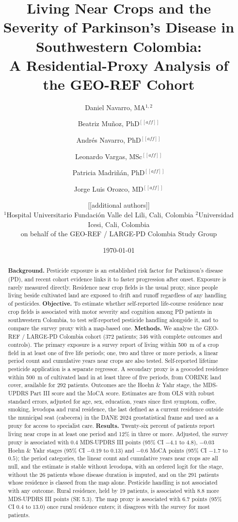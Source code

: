 \documentclass[11pt,a4paper]{article}
\title{Living Near Crops and the Severity of Parkinson's Disease in Southwestern Colombia:\\ A Residential-Proxy Analysis of the GEO-REF Cohort}
\author{Daniel Navarro, MA$^{1,2}$ \and Beatriz Mu\~noz, PhD$^{[[aff]]}$ \and Andr\'es Navarro, PhD$^{[[aff]]}$ \and Leonardo Vargas, MSc$^{[[aff]]}$ \and Patricia Madri\~n\'an, PhD$^{[[aff]]}$ \and Jorge Luis Orozco, MD$^{[[aff]]}$ \and [[additional authors]]\\[1ex]
\small $^{1}$Hospital Universitario Fundaci\'on Valle del Lili, Cali, Colombia \quad $^{2}$Universidad Icesi, Cali, Colombia\\
\small on behalf of the GEO-REF / LARGE-PD Colombia Study Group}
\date{\today}
\begin{document}
\maketitle

\begin{abstract}
\noindent\textbf{Background.} Pesticide exposure is an established risk factor for Parkinson's disease (PD), and recent cohort evidence links it to faster progression after onset. Exposure is rarely measured directly. Residence near crop fields is the usual proxy, since people living beside cultivated land are exposed to drift and runoff regardless of any handling of pesticides.
\textbf{Objective.} To estimate whether self-reported life-course residence near crop fields is associated with motor severity and cognition among PD patients in southwestern Colombia, to test self-reported pesticide handling alongside it, and to compare the survey proxy with a map-based one.
\textbf{Methods.} We analyse the GEO-REF / LARGE-PD Colombia cohort (372 patients; 346 with complete outcomes and controls). The primary exposure is a survey report of living within 500~m of a crop field in at least one of five life periods; one, two and three or more periods, a linear period count and cumulative years near crops are also tested. Self-reported lifetime pesticide application is a separate regressor. A secondary proxy is a geocoded residence within 500~m of cultivated land in at least three of five periods, from CORINE land cover, available for 292 patients. Outcomes are the Hoehn \& Yahr stage, the MDS-UPDRS Part III score and the MoCA score. Estimates are from OLS with robust standard errors, adjusted for age, sex, education, years since first symptom, coffee, smoking, levodopa and rural residence, the last defined as a current residence outside the municipal seat (cabecera) in the DANE 2024 geostatistical frame and used as a proxy for access to specialist care.
\textbf{Results.} Twenty-six percent of patients report living near crops in at least one period and 12\% in three or more. Adjusted, the survey proxy is associated with $0.4$ MDS-UPDRS III points (95\% CI $-4.1$ to $4.8$), $-0.03$ Hoehn \& Yahr stages (95\% CI $-0.19$ to $0.13$) and $-0.6$ MoCA points (95\% CI $-1.7$ to $0.5$); the period categories, the linear count and cumulative years near crops are all null, and the estimate is stable without levodopa, with an ordered logit for the stage, without the 26 patients whose disease duration is imputed, and on the 291 patients whose residence is classed from the map alone. Pesticide handling is not associated with any outcome. Rural residence, held by 19 patients, is associated with 8.8 more MDS-UPDRS III points (SE 5.3). The map proxy is associated with 6.7 points (95\% CI $0.4$ to $13.0$) once rural residence enters; it disagrees with the survey for most patients.

\end{abstract}
\end{document}
